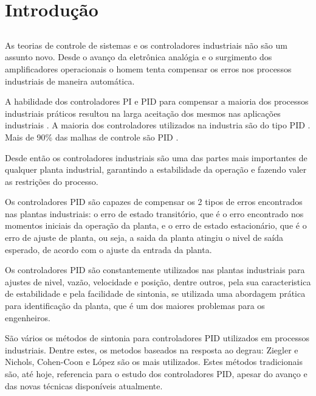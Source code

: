 \chapter{Introdução\label{cap:introducao}}

\section*{}

    As teorias de controle de sistemas e os controladores industriais não são um assunto
    novo. Desde o avanço da eletrônica analógia e o surgimento dos amplificadores
    operacionais o homem tenta compensar os erros nos processos industriais de maneira
    automática.

    A habilidade dos controladores \ac{PI} e \ac{PID} para compensar a maioria dos processos
    industriais práticos resultou na larga aceitação dos mesmos nas aplicações industriais
    \cite{Dwyer}. A maioria dos controladores utilizados na industria são do tipo
    \acs{PID} \cite{astrom1984645}. Mais de 90\% das malhas de controle são \acs{PID}
    \cite{astrom20011163}. 

    Desde então os controladores industriais são uma das partes mais importantes de qualquer
    planta industrial, garantindo a estabilidade da operação e fazendo valer as restrições
    do processo.

    Os controladores \acs{PID} são capazes de compensar os 2 tipos de erros encontrados
    nas plantas industriais: o erro de estado transitório, que é o erro encontrado nos momentos
    iniciais da operação da planta, e o erro de estado estacionário, que é o erro de
    ajuste de planta, ou seja, a saida da planta atingiu o nivel de saída esperado, de
    acordo com o ajuste da entrada da planta.

    Os controladores \acs{PID} são constantemente utilizados nas plantas industriais para
    ajustes de nivel, vazão, velocidade e posição, dentre outros, pela sua caracteristica
    de estabilidade e pela facilidade de sintonia, se utilizada uma abordagem prática
    para identificação da planta, que é um dos maiores problemas para os engenheiros.

    São vários os métodos de sintonia para controladores \acs{PID} utilizados em processos
    industriais. Dentre estes, os metodos baseados na resposta ao degrau: Ziegler e Nichols,
    Cohen-Coon e López são os mais utilizados. Estes métodos tradicionais são, até hoje,
    referencia para o estudo dos controladores \ac{PID}, apesar do avanço e das novas
    técnicas disponíveis atualmente.

